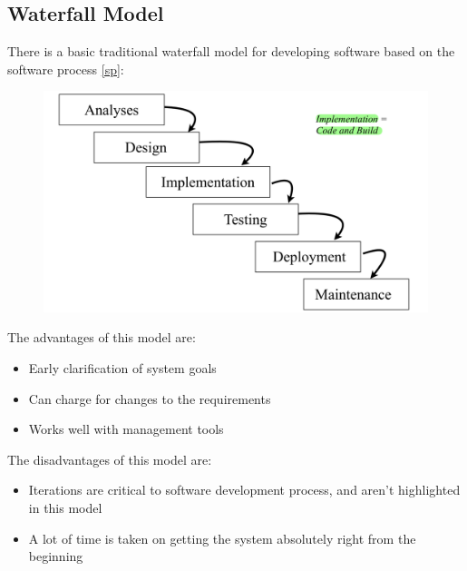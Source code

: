\documentclass{article}
\begin{document}
\subsection{Waterfall Model}
There is a basic traditional waterfall model for developing software based on the software process \eqref{sp}:
\begin{figure}[H]
    \centering
\includegraphics[width=0.6\linewidth]{Pictures/Screenshot 2023-02-08 at 12.13.38.png}
\end{figure}
The advantages of this model are:
\begin{itemize}
    \item Early clarification of system goals
    \item Can charge for changes to the requirements
    \item Works well with management tools
\end{itemize}
The disadvantages of this model are:
\begin{itemize}
    \item Iterations are critical to software development process, and aren't highlighted in this model
    \item A lot of time is taken on getting the system absolutely right from the beginning
\end{itemize}
\end{document}
